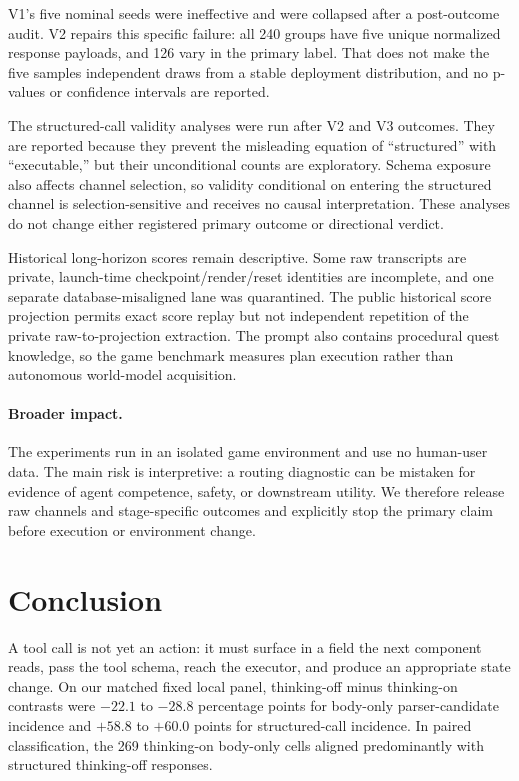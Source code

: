 \documentclass[10pt]{article}
\begin{document}
V1's five nominal seeds were ineffective and were collapsed after a
post-outcome audit. V2 repairs this specific failure: all 240 groups have five
unique normalized response payloads, and 126 vary in the primary label. That does not
make the five samples independent draws from a stable deployment distribution,
and no p-values or confidence intervals are reported.

The structured-call validity analyses were run after V2 and V3 outcomes. They
are reported because they prevent the misleading equation of ``structured''
with ``executable,'' but their unconditional counts are exploratory. Schema
exposure also affects channel selection, so validity conditional on entering
the structured channel is selection-sensitive and receives no causal
interpretation. These analyses do not change either registered primary outcome
or directional verdict.

Historical long-horizon scores remain descriptive. Some raw transcripts are
private, launch-time checkpoint/render/reset identities are incomplete, and one
separate database-misaligned lane was quarantined. The public historical score
projection permits exact score replay but not independent repetition of the
private raw-to-projection extraction. The prompt also contains procedural quest
knowledge, so the game benchmark measures plan execution rather than autonomous
world-model acquisition.

\paragraph{Broader impact.}
The experiments run in an isolated game environment and use no human-user data.
The main risk is interpretive: a routing diagnostic can be mistaken for evidence
of agent competence, safety, or downstream utility. We therefore release raw
channels and stage-specific outcomes and explicitly stop the primary claim
before execution or environment change.

\section{Conclusion}

A tool call is not yet an action: it must surface in a field the next component
reads, pass the tool schema, reach the executor, and produce an appropriate
state change. On our matched fixed local panel, thinking-off minus thinking-on
contrasts were $-22.1$ to $-28.8$ percentage points for body-only
parser-candidate incidence and $+58.8$ to $+60.0$ points for structured-call
incidence. In paired classification, the 269 thinking-on body-only cells
aligned predominantly with structured thinking-off responses.
\end{document}
